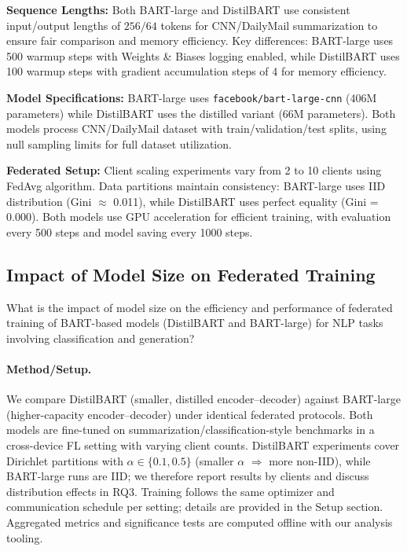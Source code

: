 \documentclass[conference]{IEEEtran}
\begin{document}
\textbf{Sequence Lengths:} Both BART-large and DistilBART use consistent input/output lengths of $256/64$ tokens for CNN/DailyMail summarization to ensure fair comparison and memory efficiency. Key differences: BART-large uses 500 warmup steps with Weights \& Biases logging enabled, while DistilBART uses 100 warmup steps with gradient accumulation steps of 4 for memory efficiency.

\textbf{Model Specifications:} BART-large uses \texttt{facebook/bart-large-cnn} (406M parameters) while DistilBART uses the distilled variant (66M parameters). Both models process CNN/DailyMail dataset with train/validation/test splits, using null sampling limits for full dataset utilization.

\textbf{Federated Setup:} Client scaling experiments vary from 2 to 10 clients using FedAvg algorithm. Data partitions maintain consistency: BART-large uses IID distribution (Gini $\approx$ 0.011), while DistilBART uses perfect equality (Gini = 0.000). Both models use GPU acceleration for efficient training, with evaluation every 500 steps and model saving every 1000 steps.

\subsection{Impact of Model Size on Federated Training}\label{sec:rq1}
What is the impact of model size on the efficiency and performance of federated training of BART-based models (DistilBART and BART-large) for NLP tasks involving classification and generation?

\paragraph{Method/Setup.} We compare DistilBART (smaller, distilled encoder--decoder) against BART-large (higher-capacity encoder--decoder) under identical federated protocols. Both models are fine-tuned on summarization/classification-style benchmarks in a cross-device FL setting with varying client counts. DistilBART experiments cover Dirichlet partitions with $\alpha\in\{0.1, 0.5\}$ (smaller $\alpha$ $\Rightarrow$ more non-IID), while BART-large runs are IID; we therefore report results by clients and discuss distribution effects in RQ3. Training follows the same optimizer and communication schedule per setting; details are provided in the Setup section. Aggregated metrics and significance tests are computed offline with our analysis tooling.
\end{document}
